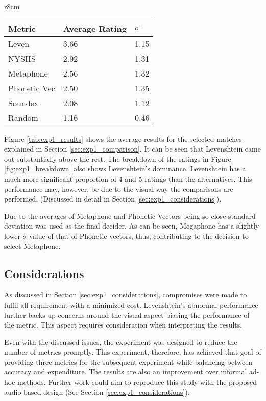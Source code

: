 \begin{wraptable}[11]{r}{8cm}
    \centering
    \begin{tabular}{|l|l|l|}
        \hline
        \textbf{Metric} & \textbf{Average Rating}  & \textbf{$\sigma$}\\
        \hline
        Leven     & 3.66  & 1.15\\
        NYSIIS    & 2.92 & 1.31\\
        Metaphone & 2.56 & 1.32\\
        Phonetic Vec & 2.50 & 1.35\\
        Soundex & 2.08 & 1.12 \\
        \hline
        Random  & 1.16 & 0.46\\
        \hline
    \end{tabular}
    \caption{Average metric performance}
    \label{tab:exp1_results}
\end{wraptable}


Figure \ref{tab:exp1_results} shows the average results for the selected matches explained in Section \ref{sec:exp1_comparison}. It can be seen that Levenshtein came out substantially above the rest. The breakdown of the ratings in Figure \ref{fig:exp1_breakdown} also shows Levenshtein's dominance. Levenshtein has a much more significant proportion of 4 and 5 ratings than the alternatives. This performance may, however, be due to the visual way the comparisons are performed. (Discussed in detail in Section \ref{sec:exp1_considerations}). 

Due to the averages of Metaphone and Phonetic Vectors being so close standard deviation was used as the final decider. As can be seen, Megaphone has a slightly lower $\sigma$ value of that of Phonetic vectors, thus, contributing to the decision to select Metaphone.

\subsection*{Considerations}
As discussed in Section \ref{sec:exp1_considerations}, compromises were made to fulfil all requirement with a minimized cost. Levenshtein's abnormal performance further backs up concerns around the visual aspect biasing the performance of the metric. This aspect requires consideration when interpreting the results. 

Even with the discussed issues, the experiment was designed to reduce the number of metrics promptly. This experiment, therefore, has achieved that goal of providing three metrics for the subsequent experiment while balancing between accuracy and expenditure. The results are also an improvement over informal ad-hoc methods. Further work could aim to reproduce this study with the proposed audio-based design (See Section \ref{sec:exp1_considerations}).

